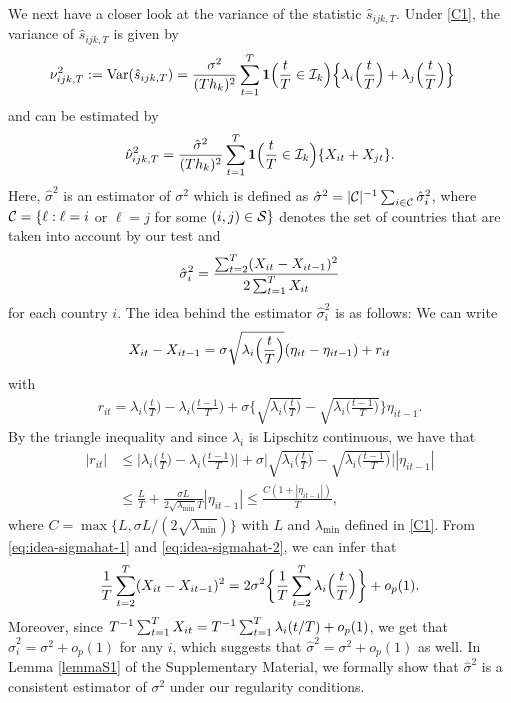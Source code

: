 \documentclass[a4paper,12pt]{article}
\numberwithin{equation}{section}
\begin{document}
{We next have a closer look at the variance of the statistic $\hat{s}_{ijk,T}$. Under \ref{C1}, the variance of $\hat{s}_{ijk,T}$ is given by
\begin{align*}
\nu_{ijk,T}^2 := \textnormal{Var}(\hat{s}_{ijk,T}) 
 & = \frac{\sigma^2}{(Th_k)^2} \sum\limits_{t=1}^T \boldsymbol{1}\Big(\frac{t}{T} \in \mathcal{I}_k\Big) \Big\{ \lambda_i\Big(\frac{t}{T}\Big) + \lambda_j\Big(\frac{t}{T}\Big) \Big\} 
\end{align*}
and can be estimated by 
\[ \hat{\nu}_{ijk,T}^2 = \frac{\hat{\sigma}^2}{(Th_k)^2} \sum\limits_{t=1}^T \boldsymbol{1}\Big(\frac{t}{T} \in \mathcal{I}_k\Big) \{ X_{it} + X_{jt} \}. \]
Here, $\hat{\sigma}^2$ is an estimator of $\sigma^2$ which is defined as $\hat{\sigma}^2 = |\mathcal{C}|^{-1} \sum_{i \in \mathcal{C}} \hat{\sigma}_i^2$, where $\mathcal{C} = \{ \ell: \ell = i$ or $\ell = j$ for some $(i,j) \in \mathcal{S} \}$ denotes the set of countries that are taken into account by our test and 
\begin{align*}
\hat{\sigma}_i^2 = \frac{\sum_{t=2}^T (X_{it}-X_{it-1})^2}{2 \sum_{t=1}^T X_{it}}
\end{align*}
for each country $i$. The idea behind the estimator $\hat{\sigma}_i^2$ is as follows: We can write 
\begin{equation}\label{eq:idea-sigmahat-1}
X_{it} - X_{it-1} = \sigma \sqrt{\lambda_i\Big(\frac{t}{T}\Big)} (\eta_{it} - \eta_{it-1}) + r_{it} 
\end{equation}
with
\begin{align*}
r_{it} = \lambda_i\Big(\frac{t}{T}\Big) - \lambda_i\Big(\frac{t-1}{T}\Big) + \sigma \bigg\{ \sqrt{\lambda_i\Big(\frac{t}{T}\Big)} - \sqrt{\lambda_i\Big(\frac{t-1}{T}\Big)} \bigg\} \eta_{it-1}.
\end{align*}
By the triangle inequality and since $\lambda_i$ is Lipschitz continuous, we have that
\begin{align}
|r_{it}| & \le \Big| \lambda_i\Big(\frac{t}{T}\Big) - \lambda_i\Big(\frac{t-1}{T}\Big)\Big| +  \sigma \bigg| \sqrt{\lambda_i\Big(\frac{t}{T}\Big)} - \sqrt{\lambda_i\Big(\frac{t-1}{T}\Big)} \bigg| |\eta_{it-1}| \nonumber \\
& \le \frac{L}{T}  + \frac{\sigma L}{2  \sqrt{\lambda_{\min}} T} |\eta_{it-1}| \le \frac{C (1 + |\eta_{it-1}|)}{T}, \label{eq:idea-sigmahat-2}
\end{align}
where $C = \max\{L,  \sigma L / (2 \sqrt{\lambda_{\min}})\}$ with $L$ and $\lambda_{\min}$ defined in \ref{C1}. From \eqref{eq:idea-sigmahat-1} and \eqref{eq:idea-sigmahat-2}, we can infer that 
\[ \frac{1}{T} \sum_{t=2}^T (X_{it} - X_{it-1})^2 = 2 \sigma^2 \bigg\{ \frac{1}{T} \sum_{t=2}^T \lambda_i\Big(\frac{t}{T}\Big) \bigg\} + o_p(1). \]
Moreover, since $T^{-1} \sum_{t=1}^T X_{it} = T^{-1} \sum_{t=1}^T \lambda_i(t/T) + o_p(1)$, we get that $\hat{\sigma}_i^2 = \sigma^2 + o_p(1)$ for any $i$, which suggests that $\hat{\sigma}^2 = \sigma^2 + o_p(1)$ as well. In Lemma \ref{lemmaS1} of the Supplementary Material, we formally show that $\hat{\sigma}^2$ is a consistent estimator of $\sigma^2$ under our regularity conditions. 


}
\end{document}
